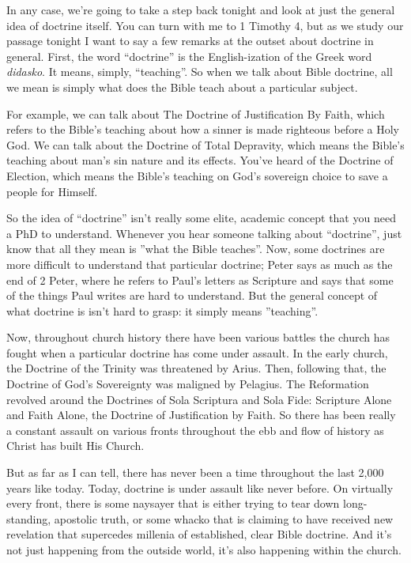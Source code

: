 \documentclass[letterpaper, 12pt]{article}
\begin{document}
    In any case, we're going to take a step back tonight and look at
    just the general idea of doctrine itself. You can turn with me to 1
    Timothy 4, but as we study our passage tonight I want to say a few
    remarks at the outset about doctrine in general. First, the word
    ``doctrine'' is the English-ization of the Greek word
    \emph{didasko}. It means, simply, ``teaching''. So when we talk
    about Bible doctrine, all we mean is simply what does the Bible
    teach about a particular subject.

    For example, we can talk about The Doctrine of Justification By
    Faith, which refers to the Bible's teaching about how a sinner is
    made righteous before a Holy God. We can talk about the Doctrine of
    Total Depravity, which means the Bible's teaching about man's sin
    nature and its effects. You've heard of the Doctrine of Election,
    which means the Bible's teaching on God's sovereign choice to save a
    people for Himself.

    So the idea of ``doctrine'' isn't really some elite, academic
    concept that you need a PhD to understand. Whenever you hear someone
    talking about ``doctrine'', just know that all they mean is ''what
    the Bible teaches''. Now, some doctrines are more difficult to
    understand that particular doctrine; Peter says as much as the end
    of 2 Peter, where he refers to Paul's letters as Scripture and says
    that some of the things Paul writes are hard to understand. But the
    general concept of what doctrine is isn't hard to grasp: it simply
    means ''teaching''.

    Now, throughout church history there have been various battles the
    church has fought when a particular doctrine has come under assault.
    In the early church, the Doctrine of the Trinity was threatened by
    Arius. Then, following that, the Doctrine of God's Sovereignty was
    maligned by Pelagius. The Reformation revolved around the Doctrines
    of Sola Scriptura and Sola Fide: Scripture Alone and Faith Alone,
    the Doctrine of Justification by Faith. So there has been really a
    constant assault on various fronts throughout the ebb and flow of
    history as Christ has built His Church.

    But as far as I can tell, there has never been a time throughout the
    last 2,000 years like today. Today, doctrine is under assault like
    never before. On virtually every front, there is some naysayer that
    is either trying to tear down long-standing, apostolic truth, or
    some whacko that is claiming to have received new revelation that
    supercedes millenia of established, clear Bible doctrine. And it's
    not just happening from the outside world, it's also happening
    within the church.
\end{document}

